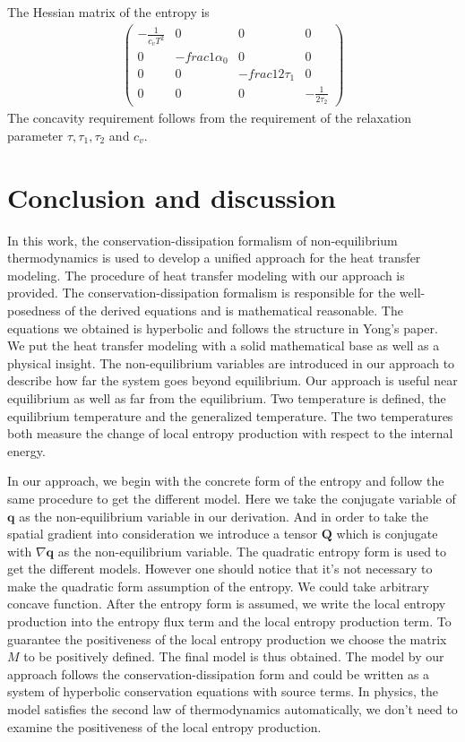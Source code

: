 \documentclass[a4paper]{article}
\begin{document}
The Hessian matrix of the entropy is 
\begin{eqnarray}
\left(\begin{array}{llll}  -\frac{1}{c_v T^2} & 0 & 0 & 0 \\
                                           0  & -frac{1}{\alpha_0} & 0 & 0 \\
										   0 & 0 & -frac{1}{2\tau_1} & 0 \\
										   0 & 0 & 0 & -\frac{1}{2\tau_2}
										   \end{array} \right)
\end{eqnarray}
The concavity requirement follows from the requirement of the relaxation parameter $\tau,\tau_1,\tau_2$ and $c_v$.

\section{Conclusion and discussion}
In this work, the conservation-dissipation formalism of non-equilibrium thermodynamics is used to develop a unified approach for the heat transfer modeling. The procedure of heat transfer modeling with our approach is provided. The conservation-dissipation formalism is responsible for the well-posedness of the derived equations and is mathematical reasonable. The equations we obtained is hyperbolic and follows the structure in Yong's paper.\cite{yong2008interesting} We put the heat transfer modeling with a solid mathematical base as well as a physical insight. The non-equilibrium variables are introduced in our approach to describe how far the system goes beyond equilibrium. Our approach is useful near equilibrium as well as far from the equilibrium. Two temperature is defined, the equilibrium temperature and the generalized temperature. The two temperatures both measure the change of local entropy production with respect to the internal energy. 

In our approach, we begin with the concrete form of the entropy and follow the same procedure to get the different model. Here we take the conjugate variable of $\mathbf{q}$ as the non-equilibrium variable in our derivation. And in order to take the spatial gradient into consideration we introduce a tensor $\mathbf{Q}$ which is conjugate with $\nabla \mathbf{q}$ as the non-equilibrium variable. The quadratic entropy form is used to get the different models. However one should notice that it's not necessary to make the quadratic form assumption of the entropy. We could take arbitrary concave function. After the entropy form is assumed, we write the local entropy production into the entropy flux term and the local entropy production term. To guarantee the positiveness of the local entropy production we choose the matrix $M$ to be positively defined. The final model is thus obtained. The model by our approach follows the conservation-dissipation form and could be written as a system of hyperbolic conservation equations with source terms. In physics, the model satisfies the second law of thermodynamics automatically, we don't need to examine the positiveness of the local entropy production.
\end{document}
